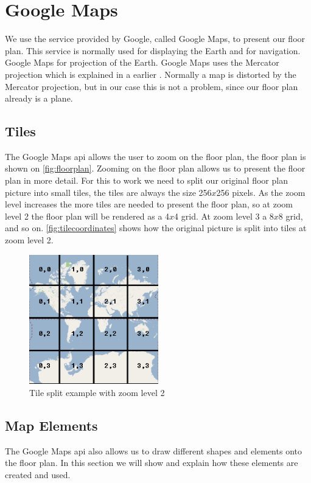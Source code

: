 \section{Google Maps}
 We use the service provided by Google, called Google Maps, to present our floor plan. This service is normally used for displaying the Earth and for navigation. Google Maps for projection of the Earth. Google Maps uses the Mercator projection which is explained in a earlier . Normally a map is distorted by the Mercator projection, but in our case this is not a problem, since our floor plan already is a plane. 
\subsection*{Tiles}
The Google Maps \ac{api} allows the user to zoom on the floor plan, the floor plan is shown on \autoref{fig:floorplan}. Zooming on the floor plan allows us to present the floor plan in more detail. For this to work we need to split our original floor plan picture into small tiles, the tiles are always the size 256$x$256 pixels. As the zoom level increases the more tiles are needed to present the floor plan, so at zoom level 2 the floor plan will be rendered as  a 4$x$4 grid. At zoom level 3 a 8$x$8 grid, and so on. \autoref{fig:tilecoordinates} shows how the original picture is split into tiles at zoom level 2.

\begin{figure}[H]
\centering
\includegraphics[width=0.5\textwidth]{img/tilecoordinates.png}
\caption{Tile split example with zoom level 2 \citep{tilecoordinates}}
\label{fig:tilecoordinates}
\end{figure}

\subsection*{Map Elements}
The Google Maps \ac{api} also allows us to draw different shapes and elements onto the floor plan. In this section we will show and explain how these elements are created and used.
